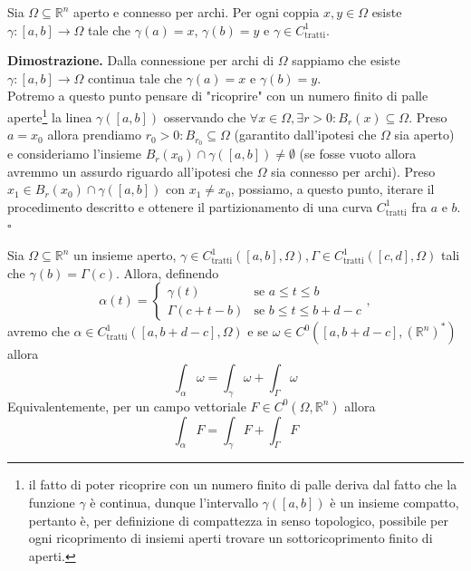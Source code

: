 \vspace{0.5cm}
\begin{lemma}
	Sia $\Omega \subseteq \mathbb{R}^n$ aperto e connesso per archi. Per ogni coppia $x, y \in \Omega$ esiste $\gamma:[a, b] \to \Omega$ tale che $\gamma(a) = x$, $\gamma(b)=y$ e $\gamma \in C^1_\text{tratti}$.
\end{lemma}

\noindent \textbf{Dimostrazione. }
	Dalla connessione per archi di $\Omega$ sappiamo che esiste $\gamma: [a, b] \to \Omega$ continua tale che $\gamma(a) = x$ e $\gamma(b) = y$. \\
	Potremo a questo punto pensare di "ricoprire" con un numero finito di palle aperte\footnote{il fatto di poter ricoprire con un numero finito di palle deriva dal fatto che la funzione $\gamma$ è continua, dunque l'intervallo $\gamma([a, b])$ è un insieme compatto, pertanto è, per definizione di compattezza in senso topologico, possibile per ogni ricoprimento di insiemi aperti trovare un sottoricoprimento finito di aperti.} la linea $\gamma([a, b])$ osservando che $\forall x \in \Omega, \exists r > 0: B_r(x) \subseteq \Omega$. Preso $a = x_0$ allora prendiamo $r_0 > 0: B_{r_0} \subseteq \Omega$ (garantito dall'ipotesi che $\Omega$ sia aperto) e consideriamo l'insieme
	$B_r(x_0) \cap \gamma([a, b]) \neq \emptyset$ (se fosse vuoto allora avremmo un assurdo riguardo all'ipotesi che $\Omega$ sia connesso per archi). Preso $x_1 \in B_r(x_0) \cap \gamma([a, b])$ con $x_1 \neq x_0$, possiamo, a questo punto, iterare il procedimento descritto e ottenere il partizionamento di una curva $C^1_\text{tratti}$ fra $a$ e $b$.
\hfill $\square$

\vspace{0.5cm}
\begin{prop}
Sia $\Omega \subseteq \mathbb{R}^n$ un insieme aperto, $\gamma \in C^1_{\text{tratti}}([a, b], \Omega), \Gamma \in C^1_{\text{tratti}}([c, d], \Omega)$ tali che $\gamma(b) = \Gamma(c)$. Allora, definendo 
$$
\alpha(t) = \begin{cases} \gamma(t) & \text{se } a \leq t \leq b \\ \Gamma(c + t - b) & \text{se } b \leq t \leq b + d -c \end{cases},
$$
avremo che $\alpha \in C^1_\text{tratti}([a, b + d -c], \Omega)$ e se $\omega \in C^0([a, b  + d - c], (\mathbb{R}^n)^*)$ allora
$$
\int_\alpha \omega = \int_\gamma \omega + \int_\Gamma \omega
$$
Equivalentemente, per un campo vettoriale $F \in C^0(\Omega, \mathbb{R}^n)$ allora
$$
\int_\alpha F = \int_\gamma F + \int_\Gamma F
$$
\label{prop:somma_curve}
\end{prop}

